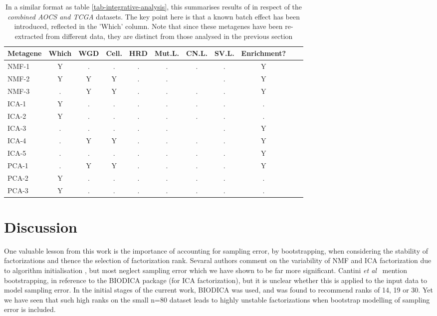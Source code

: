 \documentclass[draft,tikz, 12pt,a4paper,oneside,fleqn]{article}
\newcommand{\etal}{{\em et al\/}}
\begin{document}
\begin{table}[htb!]
\begin{center}
\begingroup
\scriptsize
\renewcommand{\arraystretch}{1.4} %
\begin{tabular}{|l||c|c|c|c|c|c|c|c|l|l|}
\hline
Metagene & Which & WGD & Cell. & HRD & Mut.L. & CN.L. & SV.L. & Enrichment? \\
\hline
NMF-1 & Y & . & . & . & . & . & . &  Y \\
NMF-2 & Y & Y & Y & . & . &   & . &  Y \\
NMF-3 & . & Y & Y & . & . & . & . &  Y \\
\hline
ICA-1 & Y & . & . & . & . & . & . &  . \\
ICA-2 & Y & . & . & . & . & . & . &  . \\
ICA-3 & . & . & . & . & . &   & . &  Y \\
ICA-4 & . & Y & Y & . & . & . & . &  Y \\
ICA-5 & . & . & . & . & . & . & . &  Y \\
\hline
PCA-1 & . & Y & Y & . & . & . & . &  Y \\
PCA-2 & Y & . & . & . & . & . & . &  . \\
PCA-3 & Y & . & . & . & . & . & . &  . \\
\hline
\end{tabular}
\endgroup
\end{center}
\caption{In a similar format as table \ref{tab-integrative-analysis}, this summarises results of in respect of the \emph{combined AOCS and TCGA} datasets.  The key point here is that a known batch effect has been introduced, reflected in the 'Which' column. Note that since these metagenes have been re-extracted from different data, they are distinct from those analysed in the previous section}
\label{tab-integrative-analysis-BOTH}
\end{table}

\clearpage

\section{Discussion}

One valuable lesson from this work is the importance of accounting for sampling error, by bootstrapping,  when considering the stability of factorizations and thence the selection of factorization rank.    Sevaral authors comment on the variability of NMF and ICA factorization due to algorithm initialisation \cite{Kairov2017,Sompairac2019,WayGregory2019}, but most neglect sampling error which we have shown to be far more significant.   Cantini \etal\ \cite{Cantini2019a} mention bootstrapping, in reference to the BIODICA package (for ICA factorization), but it is unclear whether this is applied to the input data to model sampling error.  In the initial stages of the current work, BIODICA was used, and was found to recommend ranks of 14, 19 or 30.  Yet we have seen that such high ranks on the small n=80 dataset leads to highly unstable factorizations when bootstrap modelling of sampling error is included.
\end{document}

